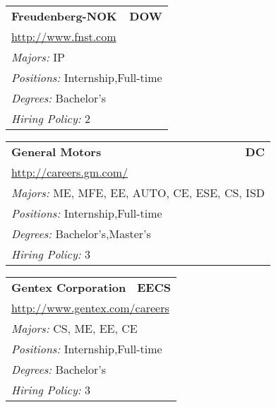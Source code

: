 \documentclass[twoside]{article}
\begin{document}
\begin{center}
\begin{multicols}{3}
\begin{FlushLeft}
\begin{minipage}{.9\columnwidth}
\end{minipage}
 
\begin{minipage}{.9\columnwidth}\begin{tabularx}{.95\columnwidth}{Xr}
                 {\Large\bf Freudenberg-NOK} & {\Large\bf DOW}\\
    \multicolumn{2}{p{.95\columnwidth}}{\url{http://www.fnst.com}}\\
    \multicolumn{2}{p{.95\columnwidth}}{\emph{Majors:} IP}\\
    \multicolumn{2}{p{.95\columnwidth}}{\emph{Positions:} Internship,Full-time}\\
    \multicolumn{2}{p{.95\columnwidth}}{\emph{Degrees:} Bachelor's}\\
    \multicolumn{2}{p{.95\columnwidth}}{\emph{Hiring Policy:} 2}\\
    \end{tabularx}
    
\end{minipage}
 
\begin{minipage}{.9\columnwidth}\begin{tabularx}{.95\columnwidth}{Xr}
                 {\Large\bf General Motors} & {\Large\bf DC}\\
    \multicolumn{2}{p{.95\columnwidth}}{\url{http://careers.gm.com/}}\\
    \multicolumn{2}{p{.95\columnwidth}}{\emph{Majors:} ME, MFE, EE, AUTO, CE, ESE, CS, ISD}\\
    \multicolumn{2}{p{.95\columnwidth}}{\emph{Positions:} Internship,Full-time}\\
    \multicolumn{2}{p{.95\columnwidth}}{\emph{Degrees:} Bachelor's,Master's}\\
    \multicolumn{2}{p{.95\columnwidth}}{\emph{Hiring Policy:} 3}\\
    \end{tabularx}
    
\end{minipage}
 
\begin{minipage}{.9\columnwidth}\begin{tabularx}{.95\columnwidth}{Xr}
                 {\Large\bf Gentex Corporation} & {\Large\bf EECS}\\
    \multicolumn{2}{p{.95\columnwidth}}{\url{http://www.gentex.com/careers}}\\
    \multicolumn{2}{p{.95\columnwidth}}{\emph{Majors:} CS, ME, EE, CE}\\
    \multicolumn{2}{p{.95\columnwidth}}{\emph{Positions:} Internship,Full-time}\\
    \multicolumn{2}{p{.95\columnwidth}}{\emph{Degrees:} Bachelor's}\\
    \multicolumn{2}{p{.95\columnwidth}}{\emph{Hiring Policy:} 3}\\
    \end{tabularx}
    

\end{minipage}
\end{FlushLeft}
\end{multicols}
\end{center}
\end{document}
